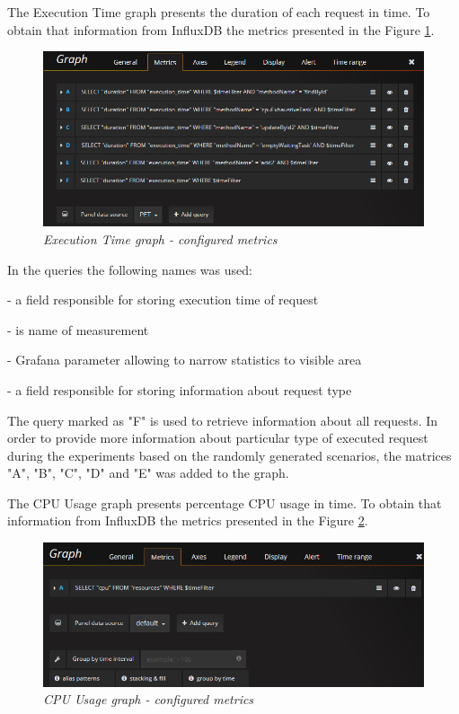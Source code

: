 \documentclass[12pt,a4paper]{article}
\let\tempone\itemize
\let\temptwo\enditemize
\renewenvironment{itemize}{\tempone\addtolength{\itemsep}{-0.4\baselineskip}}{\temptwo}
\begin{document}
The Execution Time graph presents the duration of each request in time. To obtain that information from InfluxDB the metrics presented in the Figure \ref{figure:grafanametricsexecution}. 

\begin{figure}[!htb]
\centering
\includegraphics[width=1\textwidth]{grafanametricsexecution}
\caption{\textit{Execution Time graph - configured metrics}} \label{figure:grafanametricsexecution}
\end{figure}

In the queries the following names was used: 
\begin{itemize}
\item[duration] - a field responsible for storing execution time of request
\item[execution\_time] - is name of measurement
\item[\$timeFilter] - Grafana parameter allowing to narrow statistics to visible area
\item[methodName] - a field responsible for storing information about request type
\end{itemize} 

The query marked as "F" is used to retrieve information about all requests. 
In order to provide more information about particular type of executed request during the experiments based on the randomly generated scenarios, the matrices  "A", "B", "C", "D" and "E" was added to the graph. 

The CPU Usage graph presents percentage CPU usage in time. To obtain that information from InfluxDB the metrics presented in the Figure \ref{figure:grafanametricscpu}. 

\begin{figure}[!htb]
\centering
\includegraphics[width=1\textwidth]{grafanametricscpu}
\caption{\textit{CPU Usage graph - configured metrics}} \label{figure:grafanametricscpu}
\end{figure}
\end{document}
